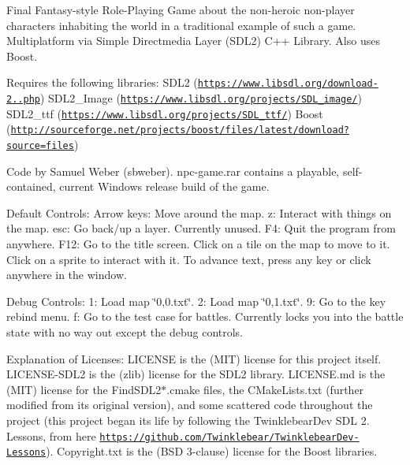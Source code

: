 Final Fantasy-\/style Role-\/\+Playing Game about the non-\/heroic non-\/player characters inhabiting the world in a traditional example of such a game. Multiplatform via Simple Directmedia Layer (S\+D\+L2) C++ Library. Also uses Boost.

Requires the following libraries\+: S\+D\+L2 (\href{https://www.libsdl.org/download-2.0.php}{\tt https\+://www.\+libsdl.\+org/download-\/2..\+php}) S\+D\+L2\+\_\+\+Image (\href{https://www.libsdl.org/projects/SDL_image/}{\tt https\+://www.\+libsdl.\+org/projects/\+S\+D\+L\+\_\+image/}) S\+D\+L2\+\_\+ttf (\href{https://www.libsdl.org/projects/SDL_ttf/}{\tt https\+://www.\+libsdl.\+org/projects/\+S\+D\+L\+\_\+ttf/}) Boost (\href{http://sourceforge.net/projects/boost/files/latest/download?source=files}{\tt http\+://sourceforge.\+net/projects/boost/files/latest/download?source=files})

Code by Samuel Weber (sbweber). npc-\/game.\+rar contains a playable, self-\/contained, current Windows release build of the game.

Default Controls\+: Arrow keys\+: Move around the map. z\+: Interact with things on the map. esc\+: Go back/up a layer. Currently unused. F4\+: Quit the program from anywhere. F12\+: Go to the title screen. Click on a tile on the map to move to it. Click on a sprite to interact with it. To advance text, press any key or click anywhere in the window.

Debug Controls\+: 1\+: Load map \char`\"{}0,0.\+txt\char`\"{}. 2\+: Load map \char`\"{}0,1.\+txt\char`\"{}. 9\+: Go to the key rebind menu. f\+: Go to the test case for battles. Currently locks you into the battle state with no way out except the debug controls.

Explanation of Licenses\+: L\+I\+C\+E\+N\+SE is the (M\+IT) license for this project itself. L\+I\+C\+E\+N\+S\+E-\/\+S\+D\+L2 is the (zlib) license for the S\+D\+L2 library. L\+I\+C\+E\+N\+S\+E.\+md is the (M\+IT) license for the Find\+S\+D\+L2$\ast$.cmake files, the C\+Make\+Lists.\+txt (further modified from its original version), and some scattered code throughout the project (this project began its life by following the Twinklebear\+Dev S\+DL 2. Lessons, from here \href{https://github.com/Twinklebear/TwinklebearDev-Lessons}{\tt https\+://github.\+com/\+Twinklebear/\+Twinklebear\+Dev-\/\+Lessons}). Copyright.\+txt is the (B\+SD 3-\/clause) license for the Boost libraries. 